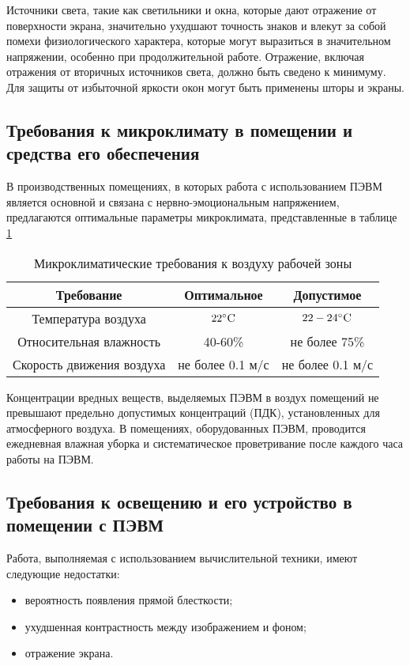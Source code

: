Источники света, такие как светильники и окна, которые дают отражение от поверхности экрана, значительно ухудшают точность знаков и влекут за собой помехи физиологического характера, которые могут выразиться в значительном напряжении, особенно при продолжительной работе. Отражение, включая отражения от вторичных источников света, должно быть сведено к минимуму. Для защиты от избыточной яркости окон могут быть применены шторы и экраны.

\subsection{Требования к микроклимату в помещении и средства его обеспечения}
В производственных помещениях, в которых работа с использованием ПЭВМ является основной и связана с нервно-эмоциональным напряжением, предлагаются оптимальные параметры микроклимата, представленные в таблице \ref{climate}


\begin{table}[h]
\caption{Микроклиматические требования к воздуху рабочей зоны}
\label{climate}
\begin{tabular}{|c|c|c|}
\hline
	Требование & Оптимальное & Допустимое \\
\hline
	Температура воздуха & $22^\circ \textsc{C}$ & $22-24^\circ \textsc{C}$ \\
\hline
	Относительная влажность & 40-60\% & не более 75\% \\
\hline
	Скорость движения воздуха & не более 0.1 м/с & не более 0.1 м/с\\
\hline
\end{tabular}
\end{table}

Концентрации вредных веществ, выделяемых ПЭВМ в воздух помещений не превышают предельно допустимых концентраций (ПДК), установленных для атмосферного воздуха. В помещениях, оборудованных ПЭВМ, проводится ежедневная влажная уборка и систематическое проветривание после каждого часа работы на ПЭВМ.

\subsection{Требования к освещению и его устройство в помещении с ПЭВМ}
Работа, выполняемая с использованием вычислительной техники, имеют следующие недостатки:
\begin{itemize}
	\item вероятность появления прямой блесткости;  
	\item ухудшенная контрастность между изображением и фоном;
	\item отражение экрана.
\end{itemize}

